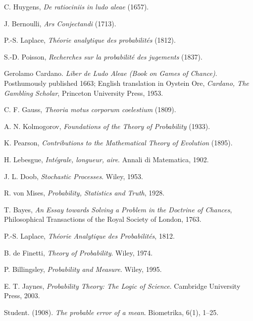\documentclass{book}
\begin{document}
\begin{thebibliography}{999}
C. Huygens,
\textit{De ratiociniis in ludo aleae} (1657).

J. Bernoulli,
\textit{Ars Conjectandi} (1713).

P.-S. Laplace, \textit{Théorie analytique des probabilités} (1812).

S.-D. Poisson, \textit{Recherches sur la probabilité des jugements} (1837).

Gerolamo Cardano.  
\textit{Liber de Ludo Aleae (Book on Games of Chance)}.  
Posthumously published 1663; English translation in Oystein Ore, \textit{Cardano, The Gambling Scholar}, Princeton University Press, 1953.

C. F. Gauss, \textit{Theoria motus corporum coelestium} (1809).

A. N. Kolmogorov, \textit{Foundations of the Theory of Probability} (1933).

K. Pearson, \textit{Contributions to the Mathematical Theory of Evolution} (1895).

H. Lebesgue,
\textit{Intégrale, longueur, aire}.
Annali di Matematica, 1902.

J. L. Doob, 
\textit{Stochastic Processes}.
 Wiley, 1953.

R. von Mises, 
\textit{Probability, Statistics and Truth}, 1928.

T. Bayes, 
\textit{An Essay towards Solving a Problem in the Doctrine of Chances}, Philosophical Transactions of the Royal Society of London, 1763.

P.-S. Laplace, 
\textit{Théorie Analytique des Probabilités}, 1812.

B. de Finetti, 
\textit{Theory of Probability}.
Wiley, 1974.

P. Billingsley, 
\textit{Probability and Measure}.
Wiley, 1995.

E. T. Jaynes, \textit{Probability Theory: The Logic of Science}.
Cambridge University Press, 2003.



Student. (1908). \textit{The probable error of a mean}.
Biometrika, 6(1), 1–25.


\end{thebibliography}
\end{document}
